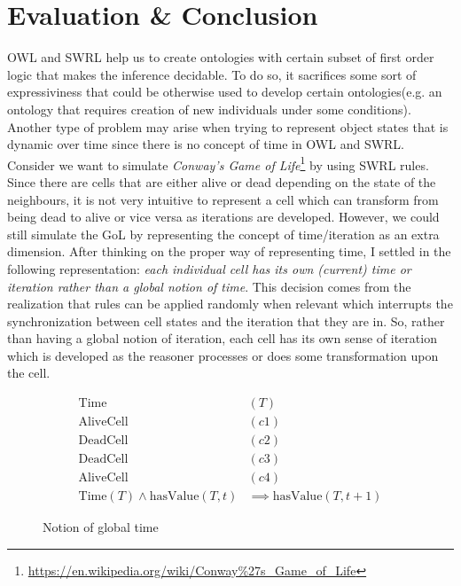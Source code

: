 \documentclass[a4paper]{article}
\begin{document}
\section{Evaluation \& Conclusion}
OWL and SWRL help us to create ontologies with certain subset of first order logic that makes the inference decidable. To do so, it sacrifices some sort of expressiviness that could be otherwise used to 
develop certain ontologies(e.g. an ontology that requires creation of new individuals under some conditions). Another type of problem may arise when trying to represent object states that is dynamic over time 
since there is no concept of time in OWL and SWRL. Consider we want to simulate \textit{Conway's Game of Life}\footnote{\url{https://en.wikipedia.org/wiki/Conway\%27s\_Game\_of\_Life}} by using SWRL rules. 
Since there are cells that are either alive or dead depending on the state of the neighbours, it is not very intuitive to represent a cell which can transform from being dead to alive or vice versa as 
iterations are developed. However, we could still simulate the GoL by representing the concept of time/iteration as an extra dimension. After thinking on the proper way of representing time, I settled in the 
following representation: \textit{each individual cell has its own (current) time or iteration rather than a global notion of time}. This decision comes from the realization that rules can be applied 
randomly when relevant which interrupts the synchronization between cell states and the iteration that they are in. So, rather than having a global notion of iteration, each cell has its own sense of 
iteration which is developed as the reasoner processes or does some transformation upon the cell.

\begin{figure}[H]
	\centering
	\begin{align*}
	\text{Time}&(T) \\
	\text{AliveCell}&(c1) \\
	\text{DeadCell}&(c2) \\
	\text{DeadCell}&(c3) \\
	\text{AliveCell}&(c4) \\
	\text{Time}(T) \land \text{hasValue}(T, t) &\implies \text{hasValue}(T, t+1)
	\end{align*}
	\caption{Notion of global time}
\end{figure}
\end{document}
